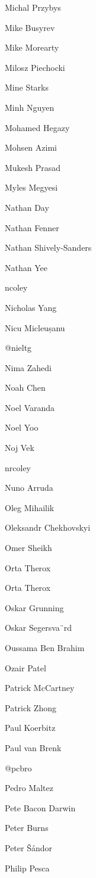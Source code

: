 \begin{DoxyItemize}
\item Michal Przybys
\item Mike Busyrev
\item Mike Morearty
\item Milosz Piechocki
\item Mine Starks
\item Minh Nguyen
\item Mohamed Hegazy
\item Mohsen Azimi
\item Mukesh Prasad
\item Myles Megyesi
\item Nathan Day
\item Nathan Fenner
\item Nathan Shively-\/\+Sanders
\item Nathan Yee
\item ncoley
\item Nicholas Yang
\item Nicu Micleușanu
\item @nieltg
\item Nima Zahedi
\item Noah Chen
\item Noel Varanda
\item Noel Yoo
\item Noj Vek
\item nrcoley
\item Nuno Arruda
\item Oleg Mihailik
\item Oleksandr Chekhovskyi
\item Omer Sheikh
\item Orta Therox
\item Orta Therox
\item Oskar Grunning
\item Oskar Segersva¨rd
\item Oussama Ben Brahim
\item Ozair Patel
\item Patrick Mc\+Cartney
\item Patrick Zhong
\item Paul Koerbitz
\item Paul van Brenk
\item @pcbro
\item Pedro Maltez
\item Pete Bacon Darwin
\item Peter Burns
\item Peter Šándor
\item Philip Pesca

\end{DoxyItemize}
